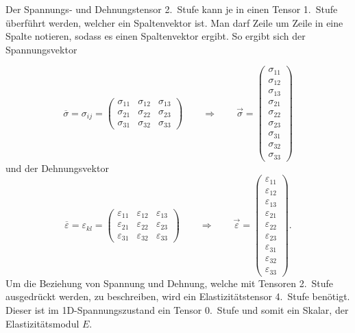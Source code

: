 Der Spannungs- und Dehnungstensor 2.~Stufe kann je in einen Tensor 1.~Stufe überführt werden, welcher ein Spaltenvektor ist.
Man darf Zeile um Zeile in eine Spalte notieren, sodass es einen Spaltenvektor ergibt.
So ergibt sich der Spannungsvektor

\[
\overline{\sigma}
=
\sigma_{i\!j}
=
\begin{pmatrix}
	\sigma_{11} & \sigma_{12} & \sigma_{13} \\ 
	\sigma_{21} & \sigma_{22} & \sigma_{23} \\
	\sigma_{31} & \sigma_{32} & \sigma_{33}
\end{pmatrix}
\qquad
\Rightarrow
\qquad
\vec{\sigma}
=
\begin{pmatrix}
	\sigma_{11}\\
	\sigma_{12}\\
	\sigma_{13}\\
	\sigma_{21}\\
	\sigma_{22}\\
	\sigma_{23}\\
	\sigma_{31}\\
	\sigma_{32}\\
	\sigma_{33}
\end{pmatrix}
\]
und der Dehnungsvektor
\[
\overline{\varepsilon}
=
\varepsilon_{kl}
=
\begin{pmatrix}
	\varepsilon_{11} & \varepsilon_{12} & \varepsilon_{13} \\ 
	\varepsilon_{21} & \varepsilon_{22} & \varepsilon_{23} \\
	\varepsilon_{31} & \varepsilon_{32} & \varepsilon_{33}
\end{pmatrix}
\qquad
\Rightarrow
\qquad
\vec{\varepsilon}
=
\begin{pmatrix}
	\varepsilon_{11} \\
	\varepsilon_{12} \\
	\varepsilon_{13} \\
	\varepsilon_{21} \\
	\varepsilon_{22} \\
	\varepsilon_{23} \\
	\varepsilon_{31} \\
	\varepsilon_{32} \\
	\varepsilon_{33}
\end{pmatrix}
.
\]
Um die Beziehung von Spannung und Dehnung, welche mit Tensoren 2.~Stufe ausgedrückt werden, zu beschreiben, wird ein Elastizitätstensor 4.~Stufe benötigt.
%
Dieser ist im 1D-Spannungszustand ein Tensor 0.~Stufe und somit ein Skalar, der Elastizitätsmodul $E$.

